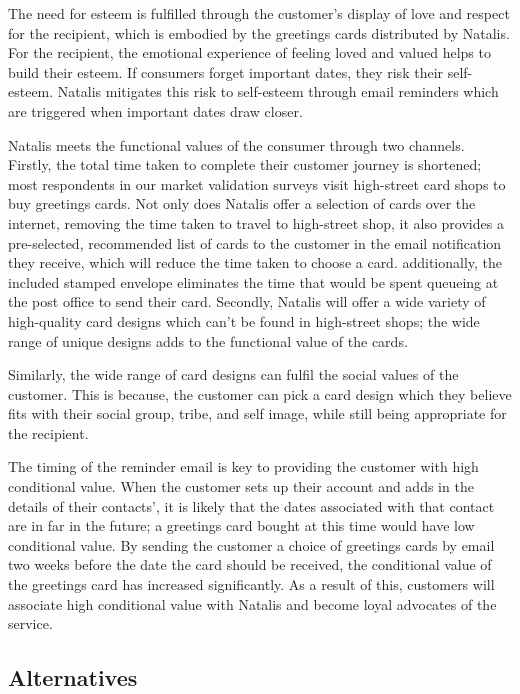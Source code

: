 \documentclass[10pt, a4paper]{article}
\begin{document}
The need for esteem is fulfilled through the customer's display of love and respect for the recipient, which is embodied by the greetings cards distributed by Natalis. For the recipient, the emotional experience of feeling loved and valued helps to build their esteem. If consumers forget important dates, they risk their self-esteem. Natalis mitigates this risk to self-esteem through email reminders which are triggered when important dates draw closer.

Natalis meets the functional values of the consumer through two channels. Firstly, the total time taken to complete their customer journey is shortened; most respondents in our market validation surveys visit high-street card shops to buy greetings cards. Not only does Natalis offer a selection of cards over the internet, removing the time taken to travel to high-street shop, it also provides a pre-selected, recommended list of cards to the customer in the email notification they receive, which will reduce the time taken to choose a card. additionally, the included stamped envelope eliminates the time that would be spent queueing at the post office to send their card. Secondly, Natalis will offer a wide variety of high-quality card designs which can’t be found in high-street shops; the wide range of unique designs adds to the functional value of the cards.

Similarly, the wide range of card designs can fulfil the social values of the customer. This is because, the customer can pick a card design which they believe fits with their social group, tribe, and self image, while still being appropriate for the recipient.

The timing of the reminder email is key to providing the customer with high conditional value. When the customer sets up their account and adds in the details of their contacts', it is likely that the dates associated with that contact are in far in the future; a greetings card bought at this time would have low conditional value. By sending the customer a choice of greetings cards by email two weeks before the date the card should be received, the conditional value of the greetings card has increased significantly. As a result of this, customers will associate high conditional value with Natalis and become loyal advocates of the service.


\subsection*{Alternatives}
\end{document}
